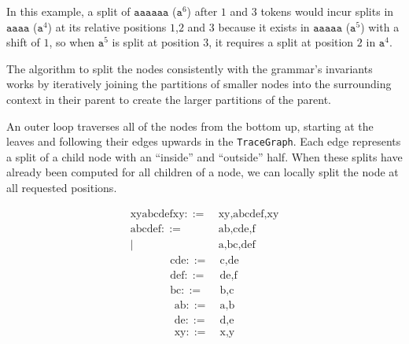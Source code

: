 In this example, a split of $\texttt{aaaaaa}$ ($\texttt{a}^6$) after $1$ and $3$ tokens would incur splits in $\texttt{aaaa}$ ($\texttt{a}^4$) at its relative positions $1$,$2$ and $3$ because it exists in $\texttt{aaaaa}$ ($\texttt{a}^5$) with a shift of $1$, so when $\texttt{a}^5$ is split at position $3$, it requires a split at position $2$ in $\texttt{a}^4$.

\noindent The algorithm to split the nodes consistently with the grammar's invariants works by iteratively joining the partitions of smaller nodes into the surrounding context in their parent to create the larger partitions of the parent.

\noindent An outer loop traverses all of the nodes from the bottom up, starting at the leaves and following their edges upwards in the \texttt{TraceGraph}. Each edge represents a split of a child node with an ``inside'' and ``outside'' half. When these splits have already been computed for all children of a node, we can locally split the node at all requested positions.
{
    \ttfamily
    \begin{multicols}{3}
    \noindent
    \begin{align*}
        \text{xyabcdefxy} ::= &\ \text{xy,abcdef,xy}\\
        \text{abcdef} ::= &\ \text{ab,cde,f}\\
                |&\ \text{a,bc,def}
    \end{align*}
    \begin{align*}
        \text{cde} ::= &\ \text{c,de}\\
        \text{def} ::= &\ \text{de,f}\\
        \text{bc} ::= &\ \text{b,c}
    \end{align*}
    \begin{align*}
        \text{ab} ::= &\ \text{a,b}\\
        \text{de} ::= &\ \text{d,e}\\
        \text{xy} ::= &\ \text{x,y}
    \end{align*}
    \end{multicols}
}
\bigskip%


